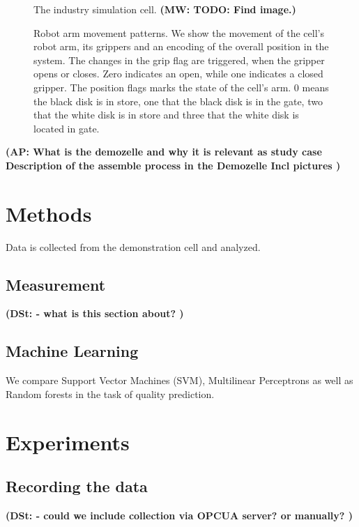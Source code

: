 \documentclass[5p,times,procedia]{elsarticle}
\newcommand{\AP}[1]{{\color{blue} {\bf (AP: #1)}}}
\newcommand{\MW}[1]{{\color{teal} {\bf (MW: #1)}}}
\newcommand{\DSt}[1]{{\color{orange} {\bf (DSt: #1)}}}
\begin{document}
\begin{figure}
\caption{The industry simulation cell. \MW{TODO: Find image.}}
\label{fig:ind_cell}
\end{figure}

\begin{figure}
       
       \caption{Robot arm movement patterns. We show the movement of the 
                cell's robot arm, its grippers and an encoding of the overall
                position in the system. The changes in the grip flag are triggered,
                when the gripper opens or closes. Zero indicates an open, while
                one indicates a closed gripper. The position flags marks the state
                of the cell's arm. 0 means the black disk is in store,
                one that the black disk is in the gate, two that the white disk
                is in store and three that the white disk is located in gate.
             }
\label{fig:robot_pos_cell}
\end{figure}


\AP{
What is the demozelle and why it is relevant as study case
Description of the assemble process in the Demozelle 
Incl pictures
}


\section{Methods} %

Data  is collected from the demonstration cell and analyzed.

\subsection{Measurement}
\DSt{
- what is this section about?
}

\subsection{Machine Learning}
We compare Support Vector Machines (SVM), Multilinear Perceptrons
\cite{bishop2006pattern} as well as Random forests in the task of
quality prediction. 


\section{Experiments}

\subsection{Recording the data}
\DSt{
- could we include collection via OPCUA server? or manually? 
}
\end{document}
